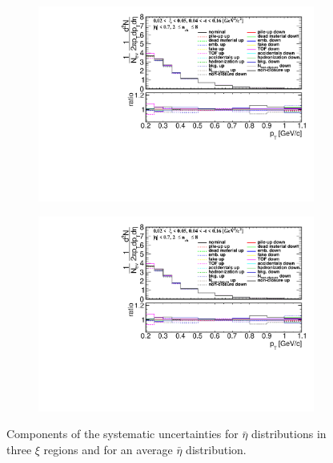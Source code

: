 \begin{figure}[h!]
\begin{subfigure}{.49\textwidth}
		\includegraphics[width=\textwidth,page=17]{chapters/chrgSTAR/img/syst/out_chargedmax.pdf}
	\end{subfigure}
	\begin{subfigure}{.49\textwidth}
		\includegraphics[width=\textwidth,page=21]{chapters/chrgSTAR/img/syst/out_chargedmax.pdf}
	\end{subfigure}
	\caption{Components of the systematic uncertainties for $\bar{\eta}$ distributions in three $\xi$ regions and for an average $\bar{\eta}$ distribution. }
	\label{fig:results_star_eta_syst}
\end{figure}


